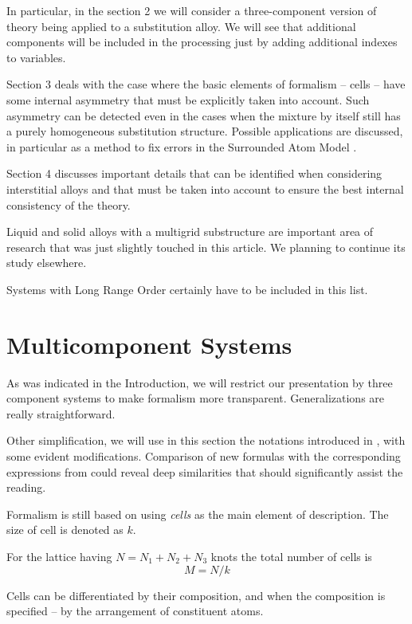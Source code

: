 \documentclass[12pt,abstract]{scrartcl}
\begin{document}
In particular, in the section 2 we will consider a three-component version of theory being applied to a substitution alloy. 
We will see that additional components will be included in the processing just by adding additional indexes to variables. 


Section 3 deals with the case where the basic elements of formalism -- cells -- have some internal asymmetry that must be explicitly  taken into account. 
Such asymmetry can be detected even in the cases when the mixture by itself still has a purely homogeneous substitution structure.
Possible applications are discussed, in particular as a method to fix errors in the Surrounded Atom Model \cite{Mathieu_1965, Hicter1967}.

Section 4 discusses important details that can be identified when considering interstitial alloys and that must be taken into account to ensure the best internal consistency of the theory.

Liquid and solid alloys  with a multigrid substructure are important area of research that was just slightly touched in this article. 
We planning to continue its study elsewhere.

Systems with Long Range Order certainly have to be included in this list.




\section{Multicomponent Systems}

As was indicated in the Introduction, we will restrict our presentation  by three component systems  to make formalism more transparent. 
Generalizations are really straightforward.

Other simplification, we will use in this section the notations introduced in \cite{TISR_p1}, with some evident modifications.
Comparison of new formulas with the corresponding expressions from \cite{TISR_p1} could reveal deep similarities that should significantly assist the reading.

Formalism is still based on using \textit{cells} as the main element of description. 
The size of cell is denoted as \( k \).

For the lattice having \(N = N_1 + N_2 + N_3\) knots the total number of cells is
\begin{equation} \label{M}
M = N / k 
\end{equation}


Cells can be differentiated   by their composition,  and when the composition  is specified -- by the arrangement of constituent atoms.
\end{document}
